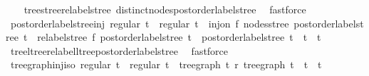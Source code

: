 \begin{isabellebody}
%
\isadelimproof
\ \ %
\endisadelimproof
%
\isatagproof
{}\isamarkupfalse%
\ tree{\isacharunderscore}{\kern0pt}stree{\isacharunderscore}{\kern0pt}relabel{\isacharunderscore}{\kern0pt}stree\ distinct{\isacharunderscore}{\kern0pt}nodes{\isacharunderscore}{\kern0pt}postorder{\isacharunderscore}{\kern0pt}label{\isacharunderscore}{\kern0pt}stree\ \isamarkupfalse%
\ fastforce%
\endisatagproof
{\isafoldproof}%
%
\isadelimproof
\isanewline
%
\endisadelimproof
\isanewline
{}\isamarkupfalse%
\ postorder{\isacharunderscore}{\kern0pt}label{\isacharunderscore}{\kern0pt}stree{\isacharunderscore}{\kern0pt}inj{\isacharcolon}{\kern0pt}\ {\isachardoublequoteopen}regular\ t{}\ {\isasymLongrightarrow}\ regular\ t{}\ {\isasymLongrightarrow}\ inj{\isacharunderscore}{\kern0pt}on\ f\ {\isacharparenleft}{\kern0pt}nodes{\isacharunderscore}{\kern0pt}stree\ {\isacharparenleft}{\kern0pt}postorder{\isacharunderscore}{\kern0pt}label{\isacharunderscore}{\kern0pt}stree\ t{}{\isacharparenright}{\kern0pt}{\isacharparenright}{\kern0pt}\ {\isasymLongrightarrow}\ relabel{\isacharunderscore}{\kern0pt}stree\ f\ {\isacharparenleft}{\kern0pt}postorder{\isacharunderscore}{\kern0pt}label{\isacharunderscore}{\kern0pt}stree\ t{}{\isacharparenright}{\kern0pt}\ {\isacharequal}{\kern0pt}\ postorder{\isacharunderscore}{\kern0pt}label{\isacharunderscore}{\kern0pt}stree\ t{}\ {\isasymLongrightarrow}\ t{}\ {\isacharequal}{\kern0pt}\ t{}{\isachardoublequoteclose}\isanewline
%
\isadelimproof
\ \ %
\endisadelimproof
%
\isatagproof
{}\isamarkupfalse%
\ tree{\isacharunderscore}{\kern0pt}ltree{\isacharunderscore}{\kern0pt}relabel{\isacharunderscore}{\kern0pt}ltree{\isacharunderscore}{\kern0pt}postorder{\isacharunderscore}{\kern0pt}label{\isacharunderscore}{\kern0pt}stree\ \isamarkupfalse%
\ fastforce%
\endisatagproof
{\isafoldproof}%
%
\isadelimproof
\isanewline
%
\endisadelimproof
\isanewline
{}\isamarkupfalse%
\ tree{\isacharunderscore}{\kern0pt}graph{\isacharunderscore}{\kern0pt}inj{\isacharunderscore}{\kern0pt}iso{\isacharcolon}{\kern0pt}\ {\isachardoublequoteopen}regular\ t{}\ {\isasymLongrightarrow}\ regular\ t{}\ {\isasymLongrightarrow}\ tree{\isacharunderscore}{\kern0pt}graph\ t{}\ {\isasymsimeq}\isactrlsub r\ tree{\isacharunderscore}{\kern0pt}graph\ t{}\ {\isasymLongrightarrow}\ t{}\ {\isacharequal}{\kern0pt}\ t{}{\isachardoublequoteclose}\isanewline
%
\isadelimproof

\end{isabellebody}
